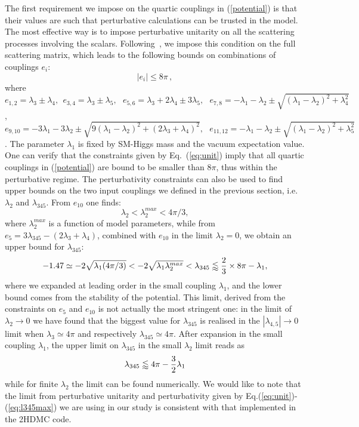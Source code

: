 \documentclass[12pt,a4paper]{article}
\newcommand {\blue} {\color{blue}}
\newcommand{\tcb}[1]{{\blue  #1}}
\begin{document}
The first requirement we impose on the quartic couplings in (\ref{potential}) is that their values are such that perturbative calculations can be trusted in the model.  The most effective way is to impose perturbative unitarity on all the scattering processes involving the scalars.
Following~\cite{Arhrib:2012ia}, we impose this condition on the full scattering matrix, which leads to the following bounds on combinations of couplings $e_i$:
%
\begin{equation}
\label{eq:unit}
|e_i|\leq 8\pi\,,
\end{equation}
where
$e_{1,2}= \lambda_3 \pm \lambda_4, \ \ e_{3,4}=\lambda_3 \pm \lambda_5, \ \ \
e_{5,6}= \lambda_3 + 2\lambda_4 \pm 3\lambda_5, \ \ \  e_{7,8} = -\lambda_1-\lambda_2 \pm \sqrt{(\lambda_1-\lambda_2)^2+\lambda_4^2}$, $e_{9,10} = -3\lambda_1 - 3\lambda_2 \pm \sqrt{9(\lambda_1 -\lambda_2)^2 + (2\lambda_3+\lambda_4)^2}, \ \ \ 
 e_{11,12} = -\lambda_1 - \lambda_2 \pm \sqrt{(\lambda_1 - \lambda_2)^2 + \lambda_5^2}
$.
The parameter $\lambda_1$ is fixed by SM-Higgs mass and the vacuum expectation value.
One can verify that the constraints given by Eq.~(\ref{eq:unit}) imply that all quartic couplings in (\ref{potential}) are bound to be smaller than $8\pi$, thus within the perturbative regime.
The perturbativity constraints can also be used to find upper bounds on the two input couplings we defined in the previous section, i.e. $\lambda_2$ and $\lambda_{345}$. From $e_{10}$ one finds:
\begin{equation}
\lambda_2<\lambda_2^{max} < 4\pi/3,
\end{equation}
where $\lambda_2^{max}$ is a function of  model parameters,
while from $e_5 = 3 \lambda_{345} - (2 \lambda_3 + \lambda_4)$, combined with $e_{10}$ in the limit $\lambda_2 = 0$, we obtain an upper bound for $\lambda_{345}$:
\begin{equation}
- 1.47 \simeq -2\sqrt{\lambda_1 (4\pi/3)} < -2\sqrt{\lambda_1\lambda_2^{max}}<\lambda_{345}\lessapprox {2\over 3} \times 8\pi - \lambda_1,
\label{eq:l345min}
\end{equation}
where we expanded at leading order in the small coupling $\lambda_1$, and the lower bound comes from the stability of the potential.
This limit, derived from the constraints on $e_5$ and $e_{10}$ is not actually the most stringent one:
in the limit of $\lambda_2 \to 0$ we have found  that the biggest value for $\lambda_{345}$
is realised in the  $|\lambda_{4,5}| \to 0$ limit when $\lambda_3 \simeq  4\pi$ 
and respectively  $\lambda_{345} \simeq 4\pi$.
After expansion in  the small coupling $\lambda_1$, the upper limit on  $\lambda_{345}$ in the small $\lambda_2 $ limit reads as 
\begin{equation}
\lambda_{345}\lessapprox 4\pi-{3\over 2}\lambda_1
\label{eq:l345max}
\end{equation}
while for finite  $\lambda_2 $ the limit can be found numerically.
\tcb{We would like to  note that the limit from perturbative unitarity and perturbativity
given by Eq.(\ref{eq:unit})-(\ref{eq:l345max}) we are using in our study is consistent with  that implemented in the 2HDMC code\cite{Eriksson:2009ws}.}
\end{document}
